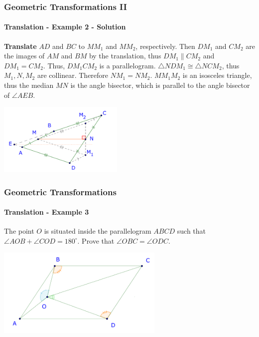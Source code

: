\documentclass[8pt,xcolor=table,dvipsnames]{beamer}
\begin{document}
\begin{frame}[t]
    \frametitle{Geometric Transformations II}
    \framesubtitle{Translation - Example 2 - Solution}
    \textbf{Translate} $AD$ and $BC$ to $MM_1$ and $MM_2$, respectively.
    Then $DM_1$ and $CM_2$ are the images of $AM$ and $BM$ by the translation, thus $DM_1 \parallel CM_2$ and $DM_1 = CM_2$.
    Thus, $DM_1CM_2$ is a parallelogram.
    \bigbreak
    $\triangle NDM_1 \cong \triangle NCM_2$, thus $M_1, N, M_2$ are collinear. Therefore $NM_1 = NM_2.$
    \bigbreak
    $MM_1M_2$ is an isosceles triangle, thus the median $MN$ is the angle bisector, which is parallel to the angle bisector of $\angle AEB.$
    \begin{center}
        \includegraphics[width=6cm]{./svg/pdf/translation-4-1.pdf}
    \end{center}
\end{frame}

\begin{frame}[t]
    \frametitle{Geometric Transformations}
    \framesubtitle{Translation - Example 3}
    \begin{example}
        The point $O$ is situated inside the parallelogram $ABCD$ such that $\angle AOB+\angle COD=180^{\circ}$.
        Prove that $\angle OBC=\angle ODC$.
    \end{example}

    \bigbreak
    \begin{center}
        \includegraphics[width=8cm]{./svg/pdf/canada-mo-1997-4-0.pdf}
    \end{center}
\end{frame}
\end{document}
